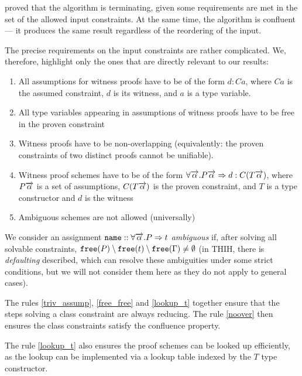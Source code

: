 \citet{vytiniotis2011outsidein} proved that the algorithm is terminating, given some requirements are met in the set of the allowed input constraints. At the same time, the algorithm is confluent --- it produces the same result regardless of the reordering of the input.

The precise requirements on the input constraints are rather complicated. We, therefore, highlight only the ones that are directly relevant to our results:

\begin{enumerate}
    \item All assumptions for witness proofs have to be of the form $d : C a$, where $C a$ is the assumed constraint, $d$ is its witness, and $a$ is a type variable. \label{triv_assump}
    \item All type variables appearing in assumptions of witness proofs have to be free in the proven constraint \label{free_free}
    \item Witness proofs have to be non-overlapping (equivalently: the proven constraints of two distinct proofs cannot be unifiable). \label{noover}
    \item Witness proof schemes have to be of the form $\forall \overrightarrow{\alpha} . P \overrightarrow{\alpha} \Rightarrow d : C (T \overrightarrow{\alpha})$, where $P \overrightarrow{\alpha}$ is a set of assumptions, $C (T \overrightarrow{\alpha})$ is the proven constraint, and $T$ is a type constructor and $d$ is the witness \label{lookup_t}
    \item Ambiguous schemes are not allowed (universally) \label{ambi_rule}
\end{enumerate}

We consider an assignment $\mathtt{name} :: \forall \overrightarrow{\alpha} . P  \Rightarrow t$ \emph{ambiguous} if, after solving all solvable constraints, $\mathtt{free} (P) \setminus \mathtt{free} (t) \setminus \mathtt{free} (\Gamma) \neq \emptyset$ (in THIH, there is \emph{defaulting} described, which can resolve these ambiguities under some strict conditions, but we will not consider them here as they do not apply to general cases).

The rules \ref{triv_assump}, \ref{free_free} and \ref{lookup_t} together ensure that the steps solving a class constraint are always reducing. The rule \ref{noover} then ensures the class constraints satisfy the confluence property.

The rule \ref{lookup_t} also ensures the proof schemes can be looked up efficiently, as the lookup can be implemented via a lookup table indexed by the $T$ type constructor.


